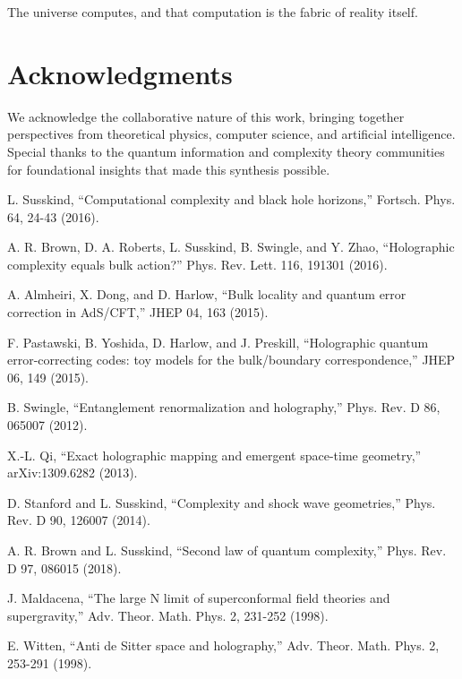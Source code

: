 \documentclass[12pt,a4paper]{article}
\begin{document}
The universe computes, and that computation is the fabric of reality itself.

\section*{Acknowledgments}

We acknowledge the collaborative nature of this work, bringing together perspectives from theoretical physics, computer science, and artificial intelligence. Special thanks to the quantum information and complexity theory communities for foundational insights that made this synthesis possible.

\begin{thebibliography}{99}

L. Susskind, ``Computational complexity and black hole horizons,'' Fortsch. Phys. 64, 24-43 (2016).

A. R. Brown, D. A. Roberts, L. Susskind, B. Swingle, and Y. Zhao, ``Holographic complexity equals bulk action?'' Phys. Rev. Lett. 116, 191301 (2016).

A. Almheiri, X. Dong, and D. Harlow, ``Bulk locality and quantum error correction in AdS/CFT,'' JHEP 04, 163 (2015).

F. Pastawski, B. Yoshida, D. Harlow, and J. Preskill, ``Holographic quantum error-correcting codes: toy models for the bulk/boundary correspondence,'' JHEP 06, 149 (2015).

B. Swingle, ``Entanglement renormalization and holography,'' Phys. Rev. D 86, 065007 (2012).

X.-L. Qi, ``Exact holographic mapping and emergent space-time geometry,'' arXiv:1309.6282 (2013).

D. Stanford and L. Susskind, ``Complexity and shock wave geometries,'' Phys. Rev. D 90, 126007 (2014).

A. R. Brown and L. Susskind, ``Second law of quantum complexity,'' Phys. Rev. D 97, 086015 (2018).

J. Maldacena, ``The large N limit of superconformal field theories and supergravity,'' Adv. Theor. Math. Phys. 2, 231-252 (1998).

E. Witten, ``Anti de Sitter space and holography,'' Adv. Theor. Math. Phys. 2, 253-291 (1998).


\end{thebibliography}
\end{document}
